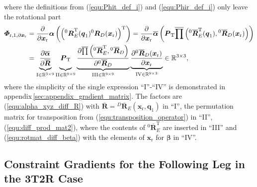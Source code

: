 \documentclass[robotics,article,submit,moreauthors,pdftex]{Definitions/mdpi}
\newcommand{\bm}[1]{\boldsymbol{#1}}
\newcommand{\rotmat}[2]{{{ }^{#1}\boldsymbol{R}}_{#2}}
\newcommand{\rotmato}[2]{{{ }^{#1}\boldsymbol{\overline{R}}}_{#2}}
\newcommand{\transp}[0]{{\mathrm{T}}}
\let\Phi\varPhi
\begin{document}
%
where the definitions from (\ref{equ:Phit_def_i}) and (\ref{equ:Phir_def_i}) only leave the rotational part
%
\begin{align}
\bm{\Phi}_{\mathrm{r},1,\partial\bm{x}_\mathrm{r}}
&=
\frac{\partial}{\partial \bm{x}_{\mathrm{r}}} \bm{\alpha}\left(\left(\rotmat{0}{E}^\transp(\bm{q}_1) \rotmat{0}{D}(\bm{x}_{\mathrm{r}})\right)^\transp\right) \label{equ:grad_Phi_1_x} 
=
\frac{\partial}{\partial \bm{x}_{\mathrm{r}}} \overline{\bm{\alpha}}\left(
\bm{P}_{\mathrm{T}}
\overline{\prod}\left( \rotmato{0}{E}^\transp(\bm{q}_1), \rotmato{0}{D}(\bm{x}_{\mathrm{r}})\right)\right) \\
&=
\underbrace{
	\vphantom{\frac{\partial \overline{\prod}\left( \rotmato{0}{E}^\transp, \rotmato{0}{D}\right)}{\partial \rotmato{0}{D}}}
    \frac{\partial \overline{\bm{\alpha}}}{\partial \overline{\bm{R}}}
	}_{\mathrm{I} \in {\mathbb{R}}^{3 \times 9}}
\underbrace{
	\vphantom{\frac{\partial \overline{\prod}\left( \rotmato{0}{E}^\transp, \rotmato{0}{D}\right)}{\partial \rotmato{0}{D}}}
    \bm{P}_{\mathrm{T}}
	}_{\mathrm{II} \in {\mathbb{R}}^{9 \times 9}}
\underbrace{
	\frac{\partial \overline{\prod}\left( \rotmato{0}{E}^\transp, \rotmato{0}{D}\right)}{\partial \rotmato{0}{D}}
	}_{\mathrm{III} \in {\mathbb{R}}^{9 \times 9}}
\underbrace{
	\frac{\partial \rotmato{0}{D}(\bm{x}_{\mathrm{r}})}{\partial \bm{x}_{\mathrm{r}}}
	}_{\mathrm{IV} \in {\mathbb{R}}^{9 \times 3}}
\in {\mathbb{R}}^{3 \times 3}, \nonumber
\end{align}
%
where the simplicity of the single expression ``I''-``IV'' is demonstrated in appendix\,\ref{sec:appendix_gradient_matrix}.
The factors are
(\ref{equ:alpha_xyz_diff_R}) with $\overline{\bm{R}}=\rotmato{D}{E}(\bm{x}_{\mathrm{r}},\bm{q}_1)$ in ``I'',
the permutation matrix for transposition from (\ref{equ:transposition_operator}) in ``II'',
(\ref{equ:diff_prod_mat2}), where the contents of $\rotmato{0}{E}^\transp$ are inserted in ``III'' and
(\ref{equ:rotmat_diff_beta}) with the elements of $\bm{x}_{\mathrm{r}}$ for $\bm{\beta}$ in ``IV''.

\subsection{Constraint Gradients for the Following Leg in the 3T2R Case}
\end{document}
